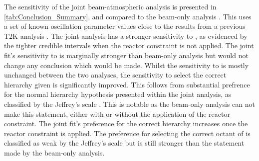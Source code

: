 
The sensitivity of the joint beam-atmospheric analysis is presented in \autoref{tab:Conclusion_Summary}, and compared to the beam-only analysis \cite{Dunne2020-uf}. This uses a set of known oscillation parameter values close to the results from a previous T2K analysis \cite{PhysRevLett.112.181801}. The joint analysis has a stronger sensitivity to , as evidenced by the tighter \quickmath{1\sigma} credible intervals when the reactor constraint is not applied. The joint fit's sensitivity to  is marginally stronger than beam-only analysis but would not change any conclusion which would be made. Whilst the sensitivity to  is mostly unchanged between the two analyses, the sensitivity to select the correct hierarchy given is significantly improved. This follows from substantial prefrence for the normal hierarchy hypothesis presented within the joint analysis, as classified by the Jeffrey's scale \cite{Jeffreys:1939xee}. This is notable as the beam-only analysis can not make this statement, either with or without the application of the reactor constraint. The joint fit's preference for the correct hierarchy increases once the reactor constraint is applied. The preference for selecting the correct octant of  is classified as weak by the Jeffrey's scale but is still stronger than the statement made by the beam-only analysis.

